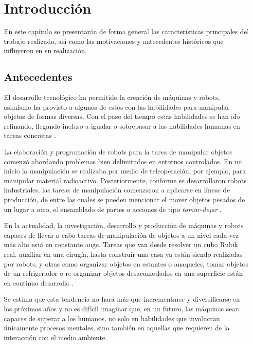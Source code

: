 \chapter{Introducción}
\label{chap:int}
%
%
En este capítulo se presentarán de forma general las características principales del trabajo realizado, así como las motivaciones y antecedentes históricos que influyeron en su realización.
%
%
\section{Antecedentes}
%
%
El desarrollo tecnológico ha permitido la creación de máquinas y robots, asimismo ha provisto a algunos de estos con las habilidades para manipular objetos de formas diversas.
Con el paso del tiempo estas habilidades se han ido refinando, llegando incluso a igualar o sobrepasar a las habilidades humanas en tareas concretas \cite{1256297}\cite{BastianSolutions}.

La elaboración y programación de robots para la tarea de manipular objetos comenzó abordando problemas bien delimitados en entornos controlados.
En un inicio la manipulación se realizaba por medio de teleoperación, por ejemplo, para manipular material radioactivo.
Posteriormente, conforme se desarrollaron robots industriales, las tareas de manipulación comenzaron a aplicarse en líneas de producción, de entre las cuales se pueden mencionar el mover objetos pesados de un lugar a otro, el ensamblado de partes o acciones de tipo \textsl{tomar-dejar} \cite{doi:10.1146/annurev-control-060117-104848}\cite{murray2017mathematical}\cite{4141037}. 

En la actualidad, la investigación, desarrollo y producción de máquinas y robots capaces de llevar a cabo tareas de manipulación de objetos a un nivel cada vez más alto está en constante auge.
Tareas que van desde resolver un cubo Rubik real, auxiliar en una cirugía, hasta construir una casa ya están siendo realizadas por robots; y otras como organizar objetos en estantes o anaqueles, tomar objetos de un refrigerador o re-organizar objetos desacomodados en una superficie están en continuo desarrollo \cite{7743540}\cite{7139396}\cite{7759839}\cite{6906894}.

Se estima que esta tendencia no hará más que incrementarse y diversificarse en los próximos años y no es difícil imaginar que, en un futuro, las máquinas sean capaces de superar a los humanos, no solo en habilidades que involucran únicamente procesos mentales, sino también en aquellas que requieren de la interacción con el medio ambiente.

